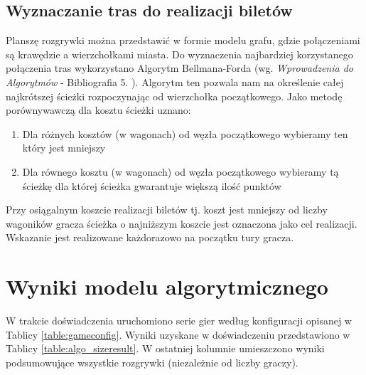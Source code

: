 \documentclass[12pt, oneside]{report}
\begin{document}
	\subsection{Wyznaczanie tras do realizacji biletów}
	Planszę rozgrywki można przedstawić w formie modelu grafu, gdzie połączeniami są krawędzie a wierzchołkami miasta. Do wyznaczenia najbardziej korzystanego połączenia tras wykorzystano Algorytm Bellmana-Forda (wg. \textit{Wprowadzenia do Algorytmów} - Bibliografia 5. ). Algorytm ten pozwala nam na określenie całej najkrótszej ścieżki rozpoczynając od wierzchołka początkowego. Jako metodę porównywawczą dla kosztu ścieżki uznano:
	\begin{enumerate}
		\item Dla różnych kosztów (w wagonach) od węzła początkowego wybieramy ten który jest mniejszy
		\item Dla równego kosztu (w wagonach) od węzła początkowego wybieramy tą ścieżkę dla której ścieżka gwarantuje większą ilość punktów
	\end{enumerate}
	Przy osiągalnym koszcie realizacji biletów tj. koszt jest mniejszy od liczby wagoników gracza ścieżka o najniższym koszcie jest oznaczona jako cel realizacji. Wskazanie jest realizowane każdorazowo na początku tury gracza.
	\section{Wyniki modelu algorytmicznego}
	W trakcie doświadczenia uruchomiono serie gier według konfiguracji opisanej w Tablicy \ref{table:gameconfig}. Wyniki uzyskane w doświadczeniu przedstawiono w Tablicy \ref{table:algo_sizeresult}. W ostatniej kolumnie umieszczono wyniki podsumowujące wszystkie rozgrywki (niezależnie od liczby graczy).
	
\end{document}
